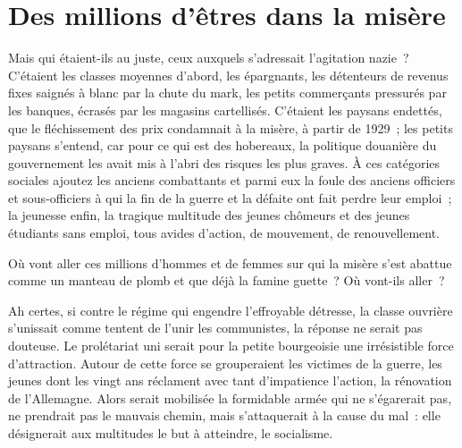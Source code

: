 \documentclass[french,twoside]{book} %
\begin{document}
\section[Des millions d’êtres dans la misère]{Des millions d’êtres dans la misère}
\noindent Mais qui étaient-ils au juste, ceux auxquels s’adressait l’agitation nazie ? C’étaient les classes moyennes d’abord, les épargnants, les détenteurs de revenus fixes saignés à blanc par la chute du mark, les petits commerçants pressurés par les banques, écrasés par les magasins cartellisés. C’étaient les paysans endettés, que le fléchissement des prix condamnait à la misère, à partir de 1929 ; les petits paysans s’entend, car pour ce qui est des hobereaux, la politique douanière du gouvernement les avait mis à l’abri des risques les plus graves. À ces catégories sociales ajoutez les anciens combattants et parmi eux la foule des anciens officiers et sous-officiers à qui la fin de la guerre et la défaite ont fait perdre leur emploi ; la jeunesse enfin, la tragique multitude des jeunes chômeurs et des jeunes étudiants sans emploi, tous avides d’action, de mouvement, de renouvellement.\par
Où vont aller ces millions d’hommes et de femmes sur qui la misère s’est abattue comme un manteau de plomb et que déjà la famine guette ? Où vont-ils aller ?\par
Ah certes, si contre le régime qui engendre l’effroyable détresse, la classe ouvrière s’unissait comme tentent de l’unir les communistes, la réponse ne serait pas douteuse. Le prolétariat uni serait pour la petite bourgeoisie une irrésistible force d’attraction. Autour de cette force se grouperaient les victimes de la guerre, les jeunes dont les vingt ans réclament avec tant d’impatience l’action, la rénovation de l’Allemagne. Alors serait mobilisée la formidable armée qui ne s’égarerait pas, ne prendrait pas le mauvais chemin, mais s’attaquerait à la cause du mal : elle désignerait aux multitudes le but à atteindre, le socialisme.
\end{document}
